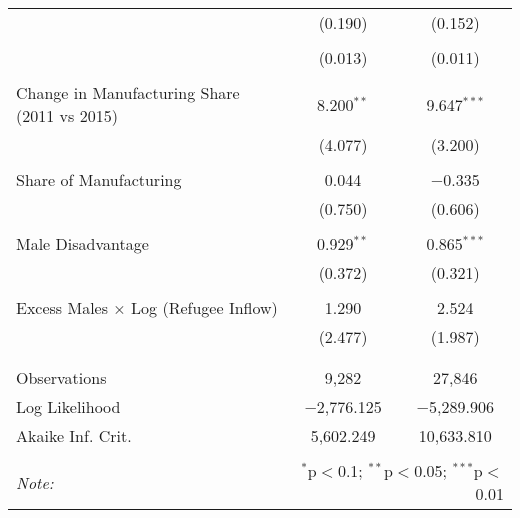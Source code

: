 \begin{table}[!htbp]
\begin{tabular}{@{\extracolsep{5pt}}lcc}
  & (0.190) & (0.152) \\ 
  & & \\ 
  & (0.013) & (0.011) \\ 
  & & \\ 
 Change in Manufacturing Share (2011 vs 2015) & 8.200$^{**}$ & 9.647$^{***}$ \\ 
  & (4.077) & (3.200) \\ 
  & & \\ 
 Share of Manufacturing & 0.044 & $-$0.335 \\ 
  & (0.750) & (0.606) \\ 
  & & \\ 
 Male Disadvantage & 0.929$^{**}$ & 0.865$^{***}$ \\ 
  & (0.372) & (0.321) \\ 
  & & \\ 
 Excess Males × Log (Refugee Inflow) & 1.290 & 2.524 \\ 
  & (2.477) & (1.987) \\ 
  & & \\ 
\hline \\[-1.8ex] 
Observations & 9,282 & 27,846 \\ 
Log Likelihood & $-$2,776.125 & $-$5,289.906 \\ 
Akaike Inf. Crit. & 5,602.249 & 10,633.810 \\ 
\hline 
\hline \\[-1.8ex] 
\textit{Note:}  & \multicolumn{2}{r}{$^{*}$p$<$0.1; $^{**}$p$<$0.05; $^{***}$p$<$0.01} \\ 
\end{tabular} 
\end{table} 
